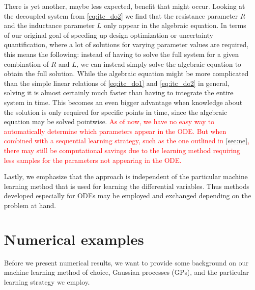 \documentclass[AMA,STIX1COL]{WileyNJD-v2}
\begin{document}
There is yet another, maybe less expected, benefit that might occur. Looking at the decoupled system from \eqref{eq:itc_do2} we find that the resistance parameter $R$ and the inductance parameter $L$ only appear in the algebraic equation. In terms of our original goal of speeding up design optimization or uncertainty quantification, where a lot of solutions for varying parameter values are required, this means the following: instead of having to solve the full system for a given combination of $R$ and $L$, we can instead simply solve the algebraic equation to obtain the full solution. While the algebraic equation might be more complicated than the simple linear relations of \eqref{eq:itc_do1} and \eqref{eq:itc_do2} in general, solving it is almost certainly much faster than having to integrate the entire system in time. This becomes an even bigger advantage when knowledge about the solution is only required for specific points in time, since the algebraic equation may be solved pointwise. \textcolor{red}{As of now, we have no easy way to automatically determine which parameters appear in the ODE. But when combined with a sequential learning strategy, such as the one outlined in \autoref{sec:ne}, there may still be computational savings due to the learning method requiring less samples for the parameters not appearing in the ODE.}

Lastly, we emphasize that the approach is independent of the particular machine learning method that is used for learning the differential variables. Thus methods developed especially for ODEs may be employed and exchanged depending on the problem at hand.

\section{Numerical examples}
\label{sec:ne}
Before we present numerical results, we want to provide some background on our machine learning method of choice, Gaussian processes (GPs), and the particular learning strategy we employ.
\end{document}
